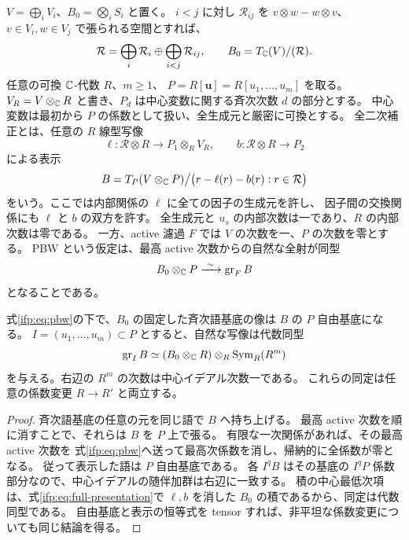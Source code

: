 $V=\bigoplus_iV_i$、$B_0=\bigotimes_iS_i$ と置く。
$i<j$ に対し $\mathcal R_{ij}$ を
$v\otimes w-w\otimes v$、$v\in V_i,w\in V_j$ で張られる空間とすれば、
\[
 \mathcal R=\bigoplus_i\mathcal R_i
               \oplus\bigoplus_{i<j}\mathcal R_{ij},
             \qquad B_0=T_{\mathbb C}(V)/(\mathcal R).
\]
任意の可換 $\mathbb C$-代数 $R$、$m\ge1$、
$P=R[\mathbf u]=R[u_1,\ldots,u_m]$ を取る。
$V_R=V\otimes_{\mathbb C}R$ と書き、$P_d$ は中心変数に関する斉次次数 $d$ の部分とする。
中心変数は最初から $P$ の係数として扱い、全生成元と厳密に可換とする。
全二次補正とは、任意の $R$ 線型写像
\[
 \ell:\mathcal R\otimes R\longrightarrow P_1\otimes_RV_R,
       \qquad b:\mathcal R\otimes R\longrightarrow P_2
\]
による表示
\begin{equation}\label{ifp:eq:full-presentation}
 B=T_P(V\otimes_{\mathbb C}P)
        \big/\bigl(r-\ell(r)-b(r):r\in\mathcal R\bigr)
\end{equation}
をいう。ここでは内部関係の $\ell$ に全ての因子の生成元を許し、
因子間の交換関係にも $\ell$ と $b$ の双方を許す。
全生成元と $u_s$ の内部次数は一であり、$R$ の内部次数は零である。
一方、active 濾過 $F$ では $V$ の次数を一、$P$ の次数を零とする。
PBW という仮定は、最高 active 次数からの自然な全射が同型
\begin{equation}\label{ifp:eq:pbw}
                 B_0\otimes_{\C}P\xrightarrow{\ \sim\ }\operatorname{gr}_F B
\end{equation}
となることである。

\begin{lemma}[中心次数の係数の独立性]
\label{ifp:lem:coefficient-extraction}
式\eqref{ifp:eq:pbw}の下で、$B_0$ の固定した斉次語基底の像は $B$ の $P$ 自由基底になる。
$I=(u_1,\ldots,u_m)\subset P$ とすると、自然な写像は代数同型
\begin{equation}\label{ifp:eq:center-associated-graded}
       \operatorname{gr}_I B
       \simeq (B_0\otimes_{\mathbb C}R)\otimes_R\operatorname{Sym}_R(R^m)
\end{equation}
を与える。右辺の $R^m$ の次数は中心イデアル次数一である。
これらの同定は任意の係数変更 $R\to R'$ と両立する。
\end{lemma}

\begin{proof}
斉次語基底の任意の元を同じ語で $B$ へ持ち上げる。
最高 active 次数を順に消すことで、それらは $B$ を $P$ 上で張る。
有限な一次関係があれば、その最高 active 次数を
式\eqref{ifp:eq:pbw}へ送って最高次係数を消し、帰納的に全係数が零となる。
従って表示した語は $P$ 自由基底である。
各 $I^qB$ はその基底の $I^qP$ 係数部分なので、中心イデアルの随伴加群は右辺に一致する。
積の中心最低次項は、式\eqref{ifp:eq:full-presentation}で
$\ell,b$ を消した $B_0$ の積であるから、同定は代数同型である。
自由基底と表示の恒等式を tensor すれば、非平坦な係数変更についても同じ結論を得る。
\end{proof}

